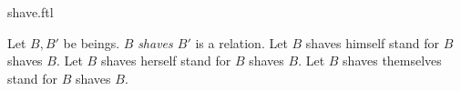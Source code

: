 \documentclass{stex}
\begin{document}
\begin{smodule}{shave.ftl}



\begin{signature*}[forthel,for=shave]
  Let $B,B'$ be beings.
  $B$ \emph{shaves $B'$} is a relation.
  Let $B$ shaves himself stand for $B$ shaves $B$.
  Let $B$ shaves herself stand for $B$ shaves $B$.
  Let $B$ shaves themselves stand for $B$ shaves $B$.
\end{signature*}

\end{smodule}
\end{document}
